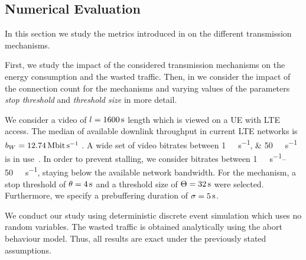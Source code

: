\subsection{Numerical Evaluation}\label{sec:application:lte_video:numerical_evaluation}

In this section we study the metrics introduced in  on the different transmission mechanisms.

First, we study the impact of the considered transmission mechanisms on the energy consumption and the wasted traffic. 
Then, in  we consider the impact of the connection count for the \streaming mechanisms and varying values of the parameters \emph{stop threshold} \bufferlower and \emph{threshold size} \buffersize in more detail.

We consider a video of \(l=\SI{1600}{\second}\) length which is viewed on a \gls{UE} with \gls{LTE} access.
The median of available downlink throughput in current \gls{LTE} networks is \(\bandwidth = \SI{12.74}{\mega\bit\per\second}\) \cite{Huang2012}.
A wide set of video bitrates between \SIlist{1;50}{\mega\bit\per\second} is in use~\cite{YouTube2013}.
In order to prevent stalling, we consider bitrates between \SIrange{1}{50}{\mega\bit\per\second}, staying below the available network bandwidth.
For the \streaming mechanism, a stop threshold of \(\theta = \SI{4}{\second}\) and a threshold size of \(\Theta = \SI{32}{\second}\) were selected.
Furthermore, we specify a prebuffering duration of \(\sigma = \SI{5}{\second}\).

We conduct our study using deterministic discrete event simulation which uses no random variables.
The wasted traffic is obtained analytically using the abort behaviour model.
Thus, all results are exact under the previously stated assumptions.

